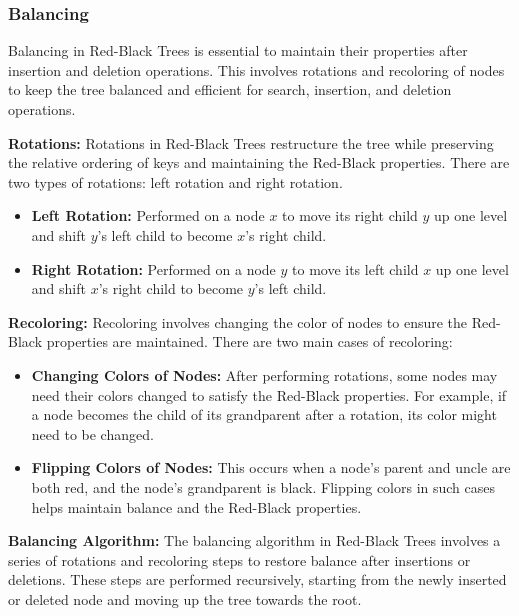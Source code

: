 \documentclass[12pt]{book} %
\begin{document}
\subsubsection{Balancing}
Balancing in Red-Black Trees is essential to maintain their properties after insertion and deletion operations. This involves rotations and recoloring of nodes to keep the tree balanced and efficient for search, insertion, and deletion operations.

\textbf{Rotations:}
Rotations in Red-Black Trees restructure the tree while preserving the relative ordering of keys and maintaining the Red-Black properties. There are two types of rotations: left rotation and right rotation.

\begin{itemize}
    \item \textbf{Left Rotation:} Performed on a node \(x\) to move its right child \(y\) up one level and shift \(y\)'s left child to become \(x\)'s right child.
  
\item \textbf{Right Rotation:} Performed on a node \(y\) to move its left child \(x\) up one level and shift \(x\)'s right child to become \(y\)'s left child.

\end{itemize}

\textbf{Recoloring:}
Recoloring involves changing the color of nodes to ensure the Red-Black properties are maintained. There are two main cases of recoloring:

\begin{itemize}
    \item \textbf{Changing Colors of Nodes:} After performing rotations, some nodes may need their colors changed to satisfy the Red-Black properties. For example, if a node becomes the child of its grandparent after a rotation, its color might need to be changed.
  
    \item \textbf{Flipping Colors of Nodes:} This occurs when a node's parent and uncle are both red, and the node's grandparent is black. Flipping colors in such cases helps maintain balance and the Red-Black properties.
\end{itemize}

\textbf{Balancing Algorithm:}
The balancing algorithm in Red-Black Trees involves a series of rotations and recoloring steps to restore balance after insertions or deletions. These steps are performed recursively, starting from the newly inserted or deleted node and moving up the tree towards the root.
\end{document}
